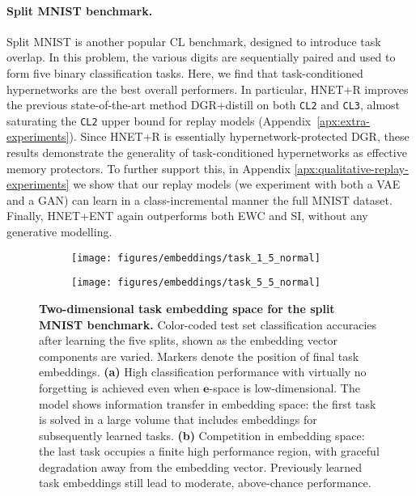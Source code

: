 \documentclass{article}
\begin{document}
\vspace{-2mm}
\paragraph{Split MNIST benchmark.} Split MNIST is another popular CL benchmark, designed to introduce task overlap. In this problem, the various digits are sequentially paired and used to form five binary classification tasks. Here, we find that task-conditioned hypernetworks are the best overall performers. In particular, HNET+R improves the previous state-of-the-art method DGR+distill on both \texttt{CL2} and \texttt{CL3}, almost saturating the \texttt{CL2} upper bound for replay models (Appendix~\ref{apx:extra-experiments}). Since HNET+R is essentially hypernetwork-protected DGR, these results demonstrate the generality of task-conditioned hypernetworks as effective memory protectors. To further support this, in Appendix \ref{apx:qualitative-replay-experiments} we show that our replay models (we experiment with both a VAE and a GAN) can learn in a class-incremental manner the full MNIST dataset. Finally, HNET+ENT again outperforms both EWC and SI, without any generative modelling.

\begin{figure}
    \centering
    \begin{subfigure}{0.42\linewidth}
    \caption{}
    \texttt{[image: figures/embeddings/task\_1\_5\_normal]}
    \end{subfigure}
    \begin{subfigure}{0.42\linewidth}
    \caption{}
    \texttt{[image: figures/embeddings/task\_5\_5\_normal]}
    \end{subfigure}
    \caption{\textbf{Two-dimensional task embedding space for the split MNIST benchmark.} Color-coded test set classification accuracies after learning the five splits, shown as the embedding vector components are varied. Markers denote the position of final task embeddings. \textbf{(a)} High classification performance with virtually no forgetting is achieved even when $\mathbf{e}$-space is low-dimensional. The model shows information transfer in embedding space: the first task is solved in a large volume that includes embeddings for subsequently learned tasks. \textbf{(b)} Competition in embedding space: the last task occupies a finite high performance region, with graceful degradation away from the embedding vector. Previously learned task embeddings still lead to moderate, above-chance performance.\vspace{-2mm} \label{fig:2D-embeddings}}
\vspace{-2mm}
\end{figure}
\end{document}

